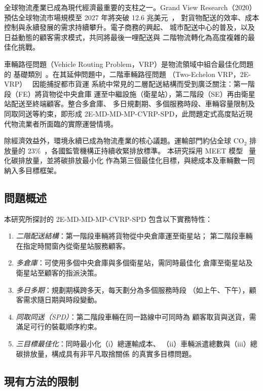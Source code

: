 \documentclass[11pt, a4paper]{article}
\numberwithin{equation}{section}
\begin{document}
全球物流產業已成為現代經濟最重要的支柱之一。Grand View Research（2020）
預估全球物流市場規模至 2027 年將突破 12.6 兆美元~\cite{grandview2020}，
對貨物配送的效率、成本控制與永續發展的需求持續攀升。電子商務的興起、
城市配送中心的普及，以及日益動態的顧客需求模式，共同將最後一哩配送與
二階物流轉化為高度複雜的最佳化挑戰。

車輛路徑問題（Vehicle Routing Problem，VRP）是物流領域中組合最佳化問題的
基礎類別~\cite{dantzig1959}。在其延伸問題中，二階車輛路徑問題
（Two-Echelon VRP，2E-VRP）~\cite{perboli2011,crainic2011} 因能捕捉都市貨運
系統中常見的二層配送結構而受到廣泛關注：第一階段（FE）將貨物從中央倉庫
運至中繼設施（衛星站），第二階段（SE）再由衛星站配送至終端顧客。整合多倉庫、
多日規劃期、多個服務時段、車輛容量限制及同取同送等約束，即形成
2E-MD-MD-MP-CVRP-SPD，此問題定式高度貼近現代物流業者所面臨的實際運營情境。

除經濟效益外，環境永續已成為物流產業的核心議題。運輸部門約佔全球
CO$_2$ 排放量的 23\%~\cite{iea2022}，各國監管機構正持續收緊排放標準。
本研究採用 MEET 模型~\cite{hickman1999} 量化碳排放量，並將碳排放最小化
作為第三個最佳化目標，與總成本及車輛數一同納入多目標框架。

\subsection{問題概述}

本研究所探討的 2E-MD-MD-MP-CVRP-SPD 包含以下實務特性：
\begin{enumerate}
  \item \textit{二階配送結構}：第一階段車輛將貨物從中央倉庫運至衛星站；
        第二階段車輛在指定時間窗內從衛星站服務顧客。
  \item \textit{多倉庫}：可使用多個中央倉庫與多個衛星站，需同時最佳化
        倉庫至衛星站及衛星站至顧客的指派決策。
  \item \textit{多日多期}：規劃期橫跨多天，每天劃分為多個服務時段
        （如上午、下午），顧客需求隨日期與時段變動。
  \item \textit{同取同送（SPD）}：第二階段車輛在同一路線中可同時為
        顧客取貨與送貨，需滿足可行的裝載順序約束。
  \item \textit{三目標最佳化}：同時最小化（i）總運輸成本、
        （ii）車輛派遣總數與（iii）總碳排放量，構成具有非平凡取捨關係
        的真實多目標問題。
\end{enumerate}

\subsection{現有方法的限制}
\end{document}
